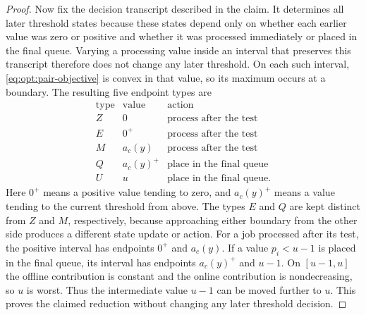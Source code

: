 \begin{proof}
Now fix the decision transcript described in the claim.  It determines all
later threshold states because these states depend only on whether each
earlier value was zero or positive and whether it was processed immediately
or placed in the final queue.  Varying a processing value inside an interval
that preserves this transcript therefore does not change any later
threshold.  On each such interval,
\eqref{eq:opt:pair-objective} is convex in that value, so its maximum occurs
at a boundary.  The resulting five endpoint types are
\begin{equation}
\begin{array}{c|c|c}
 \text{type}&\text{value}&\text{action}\\ \hline
 Z&0&\text{process after the test}\\
 E&0^+&\text{process after the test}\\
 M&a_c(y)&\text{process after the test}\\
 Q&a_c(y)^+&\text{place in the final queue}\\
 U&u&\text{place in the final queue}.
\end{array}
 \label{eq:opt:five-endpoints}
\end{equation}
Here $0^+$ means a positive value tending to zero, and $a_c(y)^+$ means a
value tending to the current threshold from above.  The types $E$ and $Q$
are kept distinct from $Z$ and $M$, respectively, because approaching either
boundary from the other side produces a different state update or action.
For a job processed after its test, the positive
interval has endpoints $0^+$ and $a_c(y)$.  If a value $p_i<u-1$ is placed
in the final queue, its interval has endpoints $a_c(y)^+$ and $u-1$.  On
$[u-1,u]$ the offline contribution is constant and the online contribution
is nondecreasing, so $u$ is worst.  Thus the intermediate value $u-1$ can
be moved further to $u$.  This proves the claimed reduction without
changing any later threshold decision.
\end{proof}

